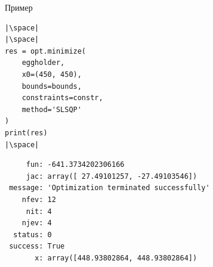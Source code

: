 \documentclass[aspectratio=169, mathserif]{beamer}%
\begin{document}
\begin{frame}[fragile, label=c]{Пример}
\scriptsize
\begin{verbatim}
|\space|
|\space|
res = opt.minimize(
    eggholder,
    x0=(450, 450),
    bounds=bounds,
    constraints=constr,
    method='SLSQP'
)
print(res)
|\space|
\end{verbatim}
\vfill
\begin{verbatim}
     fun: -641.3734202306166
     jac: array([ 27.49101257, -27.49103546])
 message: 'Optimization terminated successfully'
    nfev: 12
     nit: 4
    njev: 4
  status: 0
 success: True
       x: array([448.93802864, 448.93802864])
\end{verbatim}
\vfill
\end{frame}



\end{document}
